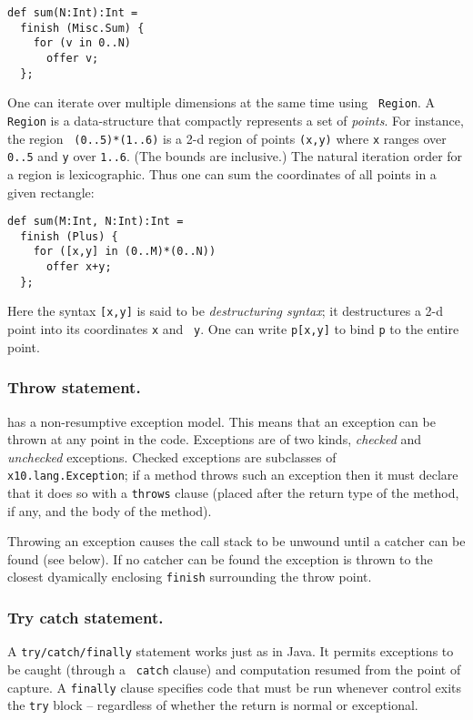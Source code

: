 {\footnotesize
\begin{verbatim}
def sum(N:Int):Int =
  finish (Misc.Sum) {
    for (v in 0..N)
      offer v;
  };
\end{verbatim}}

One can iterate over multiple dimensions at the same time using {\tt
  Region}. A {\tt Region} is a data-structure that compactly
represents a set of {\em points}. For instance, the region {\tt
  (0..5)*(1..6)} is a 2-d region of points {\tt (x,y)} where {\tt x}
ranges over {\tt 0..5} and {\tt y} over {\tt 1..6}. (The bounds are
inclusive.) The natural iteration order for a region is
lexicographic. Thus one can sum the coordinates of all points in a
given rectangle:
{\footnotesize
\begin{verbatim}
def sum(M:Int, N:Int):Int =
  finish (Plus) {
    for ([x,y] in (0..M)*(0..N))
      offer x+y;
  };
\end{verbatim}}
Here the syntax {\tt [x,y]} is said to be {\em destructuring syntax};
it destructures a 2-d point into its coordinates {\tt x} and {\tt
  y}. One can write {\tt p[x,y]} to bind {\tt p} to the entire point.


\subsubsection{Throw statement.} \Xten{} has a non-resumptive exception
  model. This means that an exception can be thrown at any point in
  the code. Exceptions are of two kinds, {\em checked} and {\em
    unchecked} exceptions. Checked exceptions are subclasses of {\tt
    x10.lang.Exception}; if a method throws such an exception then it
  must declare that it does so with a {\tt throws} clause (placed
  after the return type of the method, if any, and the body of the
  method).

Throwing an exception causes the call stack to be unwound until a
catcher can be found (see below). If no catcher can be found the
exception is thrown to the closest dyamically enclosing {\tt finish}
surrounding the throw point. 

\subsubsection{Try catch statement.} A {\tt try/catch/finally} statement works
  just as in Java. It permits exceptions to be caught (through a {\tt
    catch} clause) and computation resumed from the point of
  capture. A {\tt finally} clause specifies code that must be run
  whenever control exits the {\tt try} block -- regardless of whether
  the return is normal or exceptional.


